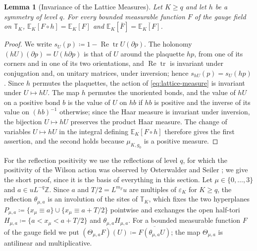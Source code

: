 \documentclass[11pt]{preprint}
\newcommand{\tr}{\operatorname{tr}}
\numberwithin{equation}{section}
\newtheorem{lemma}[theorem]{Lemma}
\theoremstyle{definition}
\theoremstyle{remark}
\theoremstyle{plain}
\begin{document}
\begin{lemma}[Invariance of the Lattice Measures]\label{lem:lattice-invariance}
Let $K \geq q$ and let $h$ be a symmetry of level $q$. For every bounded measurable function $F$ of the gauge field on $\mathbb T_K$, $\mathbb E_K[F \circ h] = \mathbb E_K[F]$ and $\mathbb E_K[\bar F] = \overline{\mathbb E_K[F]}$.
\end{lemma}

\begin{proof}
We write $s_U(p) \coloneqq 1 - \operatorname{Re}\tr U(\partial p)$. The holonomy $(hU)(\partial p) = U(h\partial p)$ is that of $U$ around the plaquette $hp$, from one of its corners and in one of its two orientations, and $\operatorname{Re}\tr$ is invariant under conjugation and, on unitary matrices, under inversion; hence $s_{hU}(p) = s_U(hp)$. Since $h$ permutes the plaquettes, the action of \eqref{eq:lattice-measure} is invariant under $U \mapsto hU$. The map $h$ permutes the unoriented bonds, and the value of $hU$ on a positive bond $b$ is the value of $U$ on $hb$ if $hb$ is positive and the inverse of its value on $(hb)^{-1}$ otherwise; since the Haar measure is invariant under inversion, the bijection $U \mapsto hU$ preserves the product Haar measure. The change of variables $U \mapsto hU$ in the integral defining $\mathbb E_K[F \circ h]$ therefore gives the first assertion, and the second holds because $\mu_{K,g_0}$ is a positive measure.
\end{proof}

For the reflection positivity we use the reflections of level $q$, for which the positivity of the Wilson action was observed by Osterwalder and Seiler \cite{OsterwalderSeiler}; we give the short proof, since it is the basis of everything in this section. Let $\mu \in \{ 0, \dots, 3 \}$ and $a \in uL^{-q}\mathbb Z$. Since $a$ and $T/2 = L^{m_T}u$ are multiples of $\varepsilon_K$ for $K \geq q$, the reflection $\theta_{\mu,a}$ is an involution of the sites of $\mathbb T_K$, which fixes the two hyperplanes $P_{\mu,a} \coloneqq \{ x_\mu \equiv a \} \cup \{ x_\mu \equiv a + T/2 \}$ pointwise and exchanges the open half-tori $H_{\mu,a} \coloneqq \{ a < x_\mu < a + T/2 \}$ and $\theta_{\mu,a}H_{\mu,a}$. For a bounded measurable function $F$ of the gauge field we put $(\Theta_{\mu,a}F)(U) \coloneqq \overline{F(\theta_{\mu,a}U)}$; the map $\Theta_{\mu,a}$ is antilinear and multiplicative.
\end{document}
